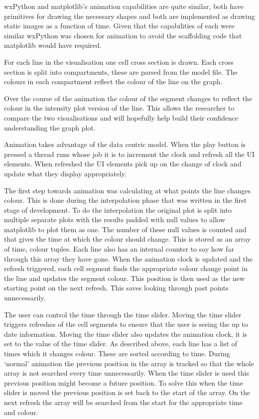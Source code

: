 wxPython and matplotlib's animation capabilities are quite similar, both have primitives for drawing the necessary shapes and both are implemented as drawing static images as a function of time.  Given that the capabilities of each were similar wxPython was chosen for animation to avoid the scaffolding code that matplotlib would have required.

For each line in the visualisation one cell cross section is drawn.  Each cross section is split into compartments, these are parsed from the model file.  The colours in each compartment reflect the colour of the line on the graph.

Over the course of the animation the colour of the segment changes to reflect the colour in the intensity plot version of the line.  This allows the researcher to compare the two visualisations and will hopefully help build their confidence understanding the graph plot.

Animation takes advantage of the data centric model.  When the play button is pressed a thread runs whose job it is to increment the clock and refresh all the \ac{UI} elements.  When refreshed the \ac{UI} elements pick up on the change of clock and update what they display appropriately.

The first step towards animation was calculating at what points the line changes colour.  This is done during the interpolation phase that was written in the first stage of development.  To do the interpolation the original plot is split into multiple separate plots with the results padded with null values to allow matplotlib to plot them as one.  The number of these null values is counted and that gives the time at which the colour should change.  This is stored as an array of time, colour tuples.  Each line also has an internal counter to say how far through this array they have gone.  When the animation clock is updated and the refresh triggered, each cell segment finds the appropriate colour change point in the line and updates the segment colour.  This position is then used as the new starting point on the next refresh.  This saves looking through past points unnecessarily.

The user can control the time through the time slider.  Moving the time slider triggers refreshes of the cell segments to ensure that the user is seeing the up to date information.  Moving the time slider also updates the animation clock, it is set to the value of the time slider.  As described above, each line has a list of times which it changes colour.  These are sorted according to time.  During `normal' animation the previous position in the array is tracked so that the whole array is not searched every time unnecessarily.  When the time slider is used this previous position might become a future position.  To solve this when the time slider is moved the previous position is set back to the start of the array.  On the next refresh the array will be searched from the start for the appropriate time and colour.

